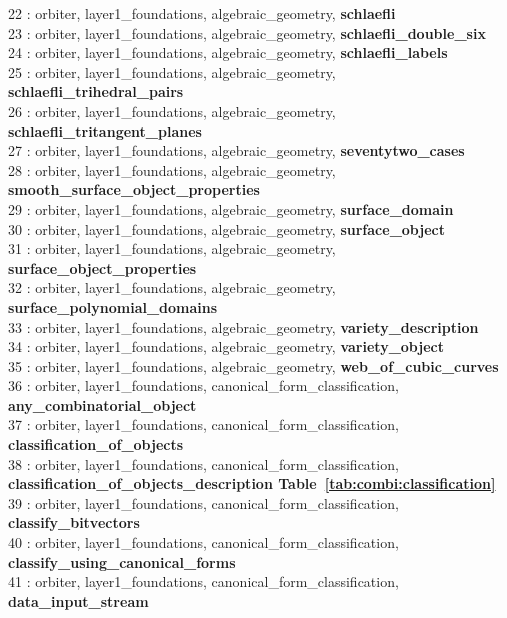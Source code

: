  22 : orbiter, layer1\_foundations, algebraic\_geometry, {\bf schlaefli}\\
 23 : orbiter, layer1\_foundations, algebraic\_geometry, {\bf schlaefli\_double\_six}\\
 24 : orbiter, layer1\_foundations, algebraic\_geometry, {\bf schlaefli\_labels}\\
 25 : orbiter, layer1\_foundations, algebraic\_geometry, {\bf schlaefli\_trihedral\_pairs}\\
 26 : orbiter, layer1\_foundations, algebraic\_geometry, {\bf schlaefli\_tritangent\_planes}\\
 27 : orbiter, layer1\_foundations, algebraic\_geometry, {\bf seventytwo\_cases}\\
 28 : orbiter, layer1\_foundations, algebraic\_geometry, {\bf smooth\_surface\_object\_properties}\\
 29 : orbiter, layer1\_foundations, algebraic\_geometry, {\bf surface\_domain}\\
 30 : orbiter, layer1\_foundations, algebraic\_geometry, {\bf surface\_object}\\
 31 : orbiter, layer1\_foundations, algebraic\_geometry, {\bf surface\_object\_properties}\\
 32 : orbiter, layer1\_foundations, algebraic\_geometry, {\bf surface\_polynomial\_domains}\\
 33 : orbiter, layer1\_foundations, algebraic\_geometry, {\bf variety\_description}\\
 34 : orbiter, layer1\_foundations, algebraic\_geometry, {\bf variety\_object}\\
 35 : orbiter, layer1\_foundations, algebraic\_geometry, {\bf web\_of\_cubic\_curves}\\
 36 : orbiter, layer1\_foundations, canonical\_form\_classification, {\bf any\_combinatorial\_object}\\
 37 : orbiter, layer1\_foundations, canonical\_form\_classification, {\bf classification\_of\_objects}\\
 38 : orbiter, layer1\_foundations, canonical\_form\_classification, {\bf classification\_of\_objects\_description Table~\ref{tab:combi:classification}}\\
 39 : orbiter, layer1\_foundations, canonical\_form\_classification, {\bf classify\_bitvectors}\\
 40 : orbiter, layer1\_foundations, canonical\_form\_classification, {\bf classify\_using\_canonical\_forms}\\
 41 : orbiter, layer1\_foundations, canonical\_form\_classification, {\bf data\_input\_stream}\\
